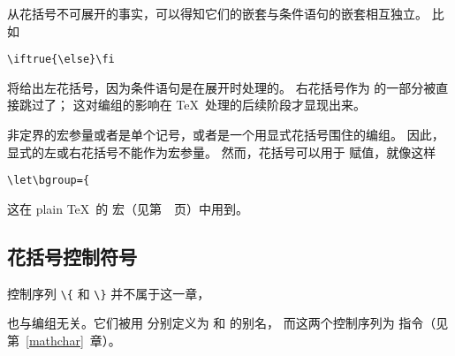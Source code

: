 \documentclass[letterpaper]{book}
\begin{document}
从花括号不可展开的事实，可以得知它们的嵌套与条件语句的嵌套相互独立。
比如
\begin{verbatim}
\iftrue{\else}\fi
\end{verbatim}
将给出左花括号，因为条件语句是在展开时处理的。
右花括号作为  的一部分被直接跳过了；
这对编组的影响在 \TeX\ 处理的后续阶段才显现出来。

非定界的宏参量或者是单个记号，或者是一个用显式花括号围住的编组。
因此，显式的左或右花括号不能作为宏参量。
然而，花括号可以用于  赋值，就像这样
\begin{verbatim}
\let\bgroup={
\end{verbatim}
这在 plain \TeX\ 的  宏（见第~\pageref{footnote:ex}~页）中用到。

\subsection{花括号控制符号}

控制序列 \verb-\{- 和 \verb-\}- 并不属于这一章，
\cstoidx{}\par\cstoidx{}\par
也与编组无关。它们被用  分别定义为
 和  的别名，
而这两个控制序列为  指令（见第~\ref{mathchar}~章）。
\end{document}
